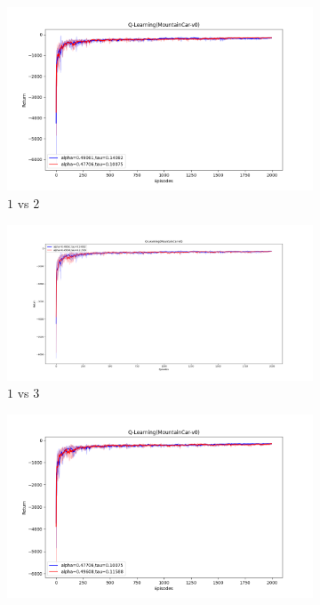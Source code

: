 \documentclass[11pt, a4]{article}
\begin{document}
				\begin{figure}[H]
					\centering
					\begin{subfigure}{.7\textwidth}
						\centering
						\includegraphics[width=\textwidth]{../mountain_car-v0/plots/qlearning_Figure_1.png}
						\caption{$1$ vs $2$}
						\label{fig:qlearningmountaincar1vs2}
					\end{subfigure}
					\hfill
					\begin{subfigure}{.8\textwidth}
						\centering
						\includegraphics[width=\textwidth]{../mountain_car-v0/plots/qlearning_Figure_2.png}
						\caption{$1$ vs $3$}
						\label{fig:qlearningmountaincar1vs3}
					\end{subfigure}
					\hfill
					\begin{subfigure}{.8\textwidth}
						\centering
						\includegraphics[width=\textwidth]{../mountain_car-v0/plots/qlearning_Figure_3.png}

\end{subfigure}
\end{figure}
\end{document}
